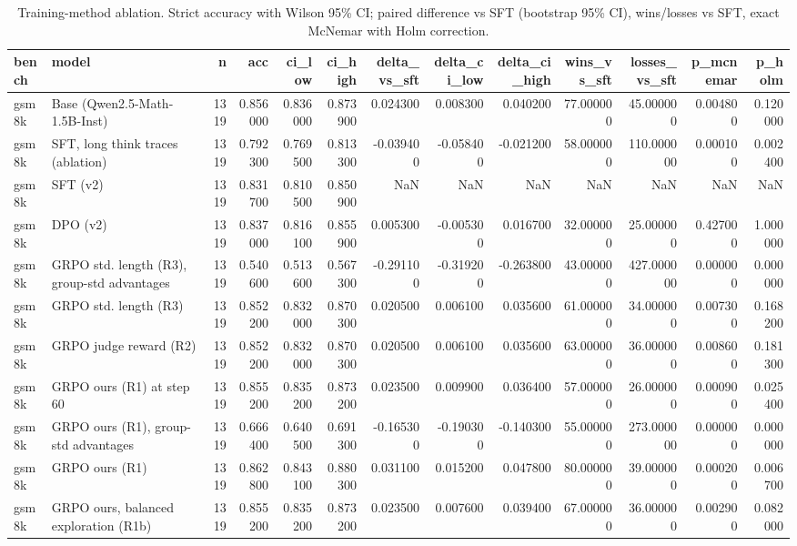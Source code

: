 \begin{table}
\caption{Training-method ablation. Strict accuracy with Wilson 95\% CI; paired difference vs SFT (bootstrap 95\% CI), wins/losses vs SFT, exact McNemar with Holm correction.}
\label{tab:stage_ablation}
\begin{tabular}{llrrrrrrrrrrr}
\toprule
bench & model & n & acc & ci_low & ci_high & delta_vs_sft & delta_ci_low & delta_ci_high & wins_vs_sft & losses_vs_sft & p_mcnemar & p_holm \\
\midrule
gsm8k & Base (Qwen2.5-Math-1.5B-Inst) & 1319 & 0.856000 & 0.836000 & 0.873900 & 0.024300 & 0.008300 & 0.040200 & 77.000000 & 45.000000 & 0.004800 & 0.120000 \\
gsm8k & SFT, long think traces (ablation) & 1319 & 0.792300 & 0.769500 & 0.813300 & -0.039400 & -0.058400 & -0.021200 & 58.000000 & 110.000000 & 0.000100 & 0.002400 \\
gsm8k & SFT (v2) & 1319 & 0.831700 & 0.810500 & 0.850900 & NaN & NaN & NaN & NaN & NaN & NaN & NaN \\
gsm8k & DPO (v2) & 1319 & 0.837000 & 0.816100 & 0.855900 & 0.005300 & -0.005300 & 0.016700 & 32.000000 & 25.000000 & 0.427000 & 1.000000 \\
gsm8k & GRPO std. length (R3), group-std advantages & 1319 & 0.540600 & 0.513600 & 0.567300 & -0.291100 & -0.319200 & -0.263800 & 43.000000 & 427.000000 & 0.000000 & 0.000000 \\
gsm8k & GRPO std. length (R3) & 1319 & 0.852200 & 0.832000 & 0.870300 & 0.020500 & 0.006100 & 0.035600 & 61.000000 & 34.000000 & 0.007300 & 0.168200 \\
gsm8k & GRPO judge reward (R2) & 1319 & 0.852200 & 0.832000 & 0.870300 & 0.020500 & 0.006100 & 0.035600 & 63.000000 & 36.000000 & 0.008600 & 0.181300 \\
gsm8k & GRPO ours (R1) at step 60 & 1319 & 0.855200 & 0.835200 & 0.873200 & 0.023500 & 0.009900 & 0.036400 & 57.000000 & 26.000000 & 0.000900 & 0.025400 \\
gsm8k & GRPO ours (R1), group-std advantages & 1319 & 0.666400 & 0.640500 & 0.691300 & -0.165300 & -0.190300 & -0.140300 & 55.000000 & 273.000000 & 0.000000 & 0.000000 \\
gsm8k & GRPO ours (R1) & 1319 & 0.862800 & 0.843100 & 0.880300 & 0.031100 & 0.015200 & 0.047800 & 80.000000 & 39.000000 & 0.000200 & 0.006700 \\
gsm8k & GRPO ours, balanced exploration (R1b) & 1319 & 0.855200 & 0.835200 & 0.873200 & 0.023500 & 0.007600 & 0.039400 & 67.000000 & 36.000000 & 0.002900 & 0.082000 \\

\end{tabular}
\end{table}
